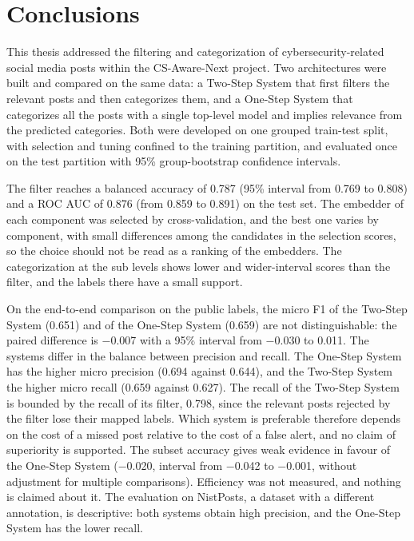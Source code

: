 \chapter{Conclusions}\label{ch:conclusions}
This thesis addressed the filtering and categorization of cybersecurity-related social media posts within the CS-Aware-Next project. Two architectures were built and compared on the same data: a Two-Step System that first filters the relevant posts and then categorizes them, and a One-Step System that categorizes all the posts with a single top-level model and implies relevance from the predicted categories. Both were developed on one grouped train-test split, with selection and tuning confined to the training partition, and evaluated once on the test partition with 95{\%} group-bootstrap confidence intervals.

The filter reaches a balanced accuracy of 0.787 (95{\%} interval from 0.769 to 0.808) and a ROC AUC of 0.876 (from 0.859 to 0.891) on the test set. The embedder of each component was selected by cross-validation, and the best one varies by component, with small differences among the candidates in the selection scores, so the choice should not be read as a ranking of the embedders. The categorization at the sub levels shows lower and wider-interval scores than the filter, and the labels there have a small support.

On the end-to-end comparison on the public labels, the micro F1 of the Two-Step System (0.651) and of the One-Step System (0.659) are not distinguishable: the paired difference is $-$0.007 with a 95{\%} interval from $-$0.030 to 0.011. The systems differ in the balance between precision and recall. The One-Step System has the higher micro precision (0.694 against 0.644), and the Two-Step System the higher micro recall (0.659 against 0.627). The recall of the Two-Step System is bounded by the recall of its filter, 0.798, since the relevant posts rejected by the filter lose their mapped labels. Which system is preferable therefore depends on the cost of a missed post relative to the cost of a false alert, and no claim of superiority is supported. The subset accuracy gives weak evidence in favour of the One-Step System ($-$0.020, interval from $-$0.042 to $-$0.001, without adjustment for multiple comparisons). Efficiency was not measured, and nothing is claimed about it. The evaluation on NistPosts, a dataset with a different annotation, is descriptive: both systems obtain high precision, and the One-Step System has the lower recall.

